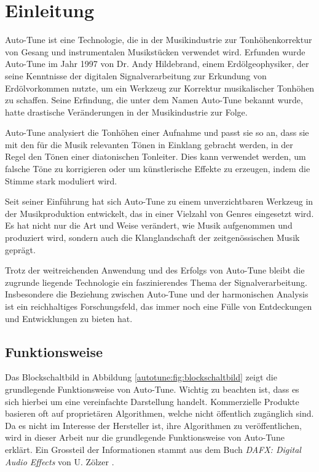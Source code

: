 %
%
%
%
\section{Einleitung\label{autotune:section:teil0}}
Auto-Tune ist eine Technologie, die in der Musikindustrie zur Tonhöhenkorrektur von Gesang und instrumentalen Musikstücken verwendet wird.
%
%
%
%
Erfunden wurde Auto-Tune im Jahr 1997 von Dr. Andy Hildebrand, einem Erdölgeophysiker,
%
der seine Kenntnisse der digitalen Signalverarbeitung zur Erkundung von Erdölvorkommen nutzte,
um ein Werkzeug zur Korrektur musikalischer Tonhöhen zu schaffen.
Seine Erfindung, die unter dem Namen Auto-Tune bekannt wurde, hatte drastische Veränderungen in der Musikindustrie zur Folge.

Auto-Tune analysiert die Tonhöhen einer Aufnahme und passt sie so an, dass sie mit den für die Musik relevanten Tönen in Einklang gebracht werden,
in der Regel den Tönen einer diatonischen Tonleiter.
Dies kann verwendet werden, um falsche Töne zu korrigieren oder um künstlerische Effekte zu erzeugen, indem die Stimme stark moduliert wird.

Seit seiner Einführung hat sich Auto-Tune zu einem unverzichtbaren Werkzeug in der Musikproduktion entwickelt,
das in einer Vielzahl von Genres eingesetzt wird.
Es hat nicht nur die Art und Weise verändert, wie Musik aufgenommen und produziert wird,
sondern auch die Klanglandschaft der zeitgenössischen Musik geprägt.

Trotz der weitreichenden Anwendung und des Erfolgs von Auto-Tune bleibt die zugrunde liegende Technologie ein faszinierendes Thema der Signalverarbeitung.
Insbesondere die Beziehung zwischen Auto-Tune und der harmonischen Analysis ist ein reichhaltiges Forschungsfeld,
das immer noch eine Fülle von Entdeckungen und Entwicklungen zu bieten hat.


\subsection{Funktionsweise
\label{autotune:subsection:funktionsweise}}
Das Blockschaltbild in Abbildung \ref{autotune:fig:blockschaltbild} zeigt die grundlegende Funktionsweise von Auto-Tune.
Wichtig zu beachten ist, dass es sich hierbei um eine vereinfachte Darstellung handelt.
Kommerzielle Produkte basieren oft auf proprietären Algorithmen, welche nicht öffentlich zugänglich sind.
Da es nicht im Interesse der Hersteller ist, ihre Algorithmen zu veröffentlichen,
wird in dieser Arbeit nur die grundlegende Funktionsweise von Auto-Tune erklärt.
Ein Grossteil der Informationen stammt aus dem Buch \emph{DAFX: Digital Audio Effects} von U. Zölzer \cite{autotune:digitalAudioEffects}.

